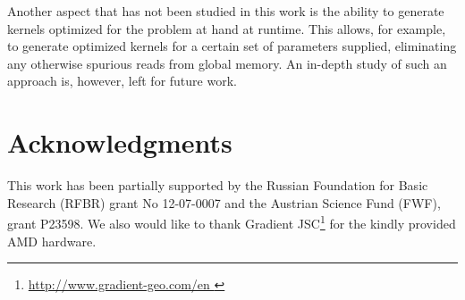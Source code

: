\documentclass[final]{siamltex}
\begin{document}
Another aspect that has not been studied in this work is the ability to generate kernels
optimized for the problem at hand at runtime. This allows, for example, to generate
optimized kernels for a certain set of parameters supplied, eliminating any otherwise spurious reads from global memory.
An in-depth study of such an approach is, however, left for future work.





\section{Acknowledgments}

This work has been partially supported by the Russian Foundation for Basic 
Research (RFBR) grant No 12-07-0007 and the Austrian Science Fund (FWF), grant P23598.
We also would like to thank Gradient JSC\footnote{ \href{
http://www.gradient-geo.com/en }{ http://www.gradient-geo.com/en } } for the
kindly provided AMD hardware.




\end{document}
